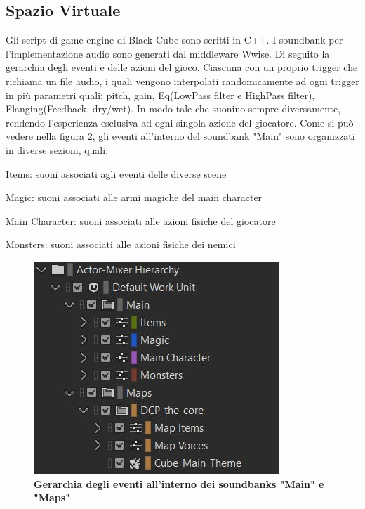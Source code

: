 	\subsection{Spazio Virtuale}
	Gli script di game engine di Black Cube sono scritti in C++. I soundbank per l'implementazione audio sono generati dal middleware Wwise. Di seguito la gerarchia degli eventi e delle azioni del gioco. Ciascuna con un proprio trigger che richiama un file audio, i quali vengono interpolati randomicamente ad ogni trigger in più parametri quali: pitch, gain, Eq(LowPass filter e HighPass filter), Flanging(Feedback, dry/wet). In modo tale che suonino sempre diversamente, rendendo l'esperienza esclusiva ad ogni singola azione del giocatore.
	Come si può vedere nella figura 2, gli eventi all'interno del soundbank "Main" sono organizzati in diverse sezioni, quali:
	\begin{compactitem}
		\item Items: suoni associati agli eventi delle diverse scene
		\item Magic: suoni associati alle armi magiche del main character
		\item Main Character: suoni associati alle azioni fisiche del giocatore
		\item Monsters: suoni associati alle azioni fisiche dei nemici
	\end{compactitem}
	
	\begin{figure}[h]
		\begin{center}
			\includegraphics[width=.47\textwidth]{img/image2.jpg}
			\caption{\textbf{Gerarchia degli eventi all'interno dei soundbanks "Main" e "Maps"}}
			\label{gr01}
		\end{center}
	\end{figure}

